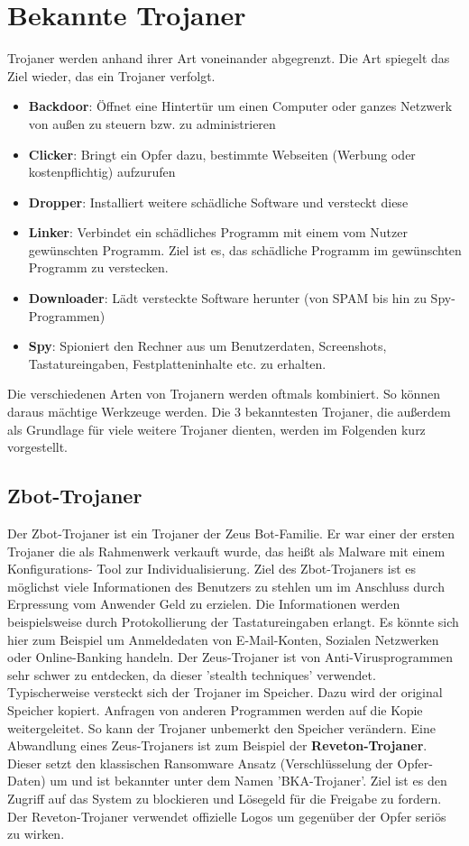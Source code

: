 \section{Bekannte Trojaner}\label{sec:bekannteTrojaner}
Trojaner werden anhand ihrer Art voneinander abgegrenzt. Die Art spiegelt das Ziel wieder, das ein Trojaner verfolgt. 
\begin{itemize}
    \item  \textbf{Backdoor}: Öffnet eine Hintertür um einen Computer oder ganzes Netzwerk von außen zu steuern bzw. zu administrieren
    \item \textbf{Clicker}: Bringt ein Opfer dazu, bestimmte Webseiten (Werbung oder kostenpflichtig) aufzurufen 
    \item \textbf{Dropper}: Installiert weitere schädliche Software und versteckt diese
    \item \textbf{Linker}: Verbindet ein schädliches Programm mit einem vom Nutzer gewünschten Programm. Ziel ist es, das schädliche Programm im gewünschten Programm zu verstecken.
    \item \textbf{Downloader}: Lädt versteckte Software herunter (von SPAM bis hin zu Spy-Programmen)
    \item \textbf{Spy}: Spioniert den Rechner aus um Benutzerdaten, Screenshots, Tastatureingaben, Festplatteninhalte etc. zu erhalten.
\end{itemize}
Die verschiedenen Arten von Trojanern werden oftmals kombiniert. So können daraus mächtige Werkzeuge werden. 
Die 3 bekanntesten Trojaner, die außerdem als Grundlage für viele weitere Trojaner dienten, werden im Folgenden kurz vorgestellt. 

\subsection{Zbot-Trojaner}
Der Zbot-Trojaner ist ein Trojaner der Zeus Bot-Familie. Er war einer der ersten
Trojaner die als Rahmenwerk verkauft wurde, das heißt als Malware mit einem Konfigurations-
Tool zur Individualisierung. Ziel des Zbot-Trojaners ist es möglichst viele Informationen
des Benutzers zu stehlen um im Anschluss durch Erpressung vom Anwender Geld zu 
erzielen. Die Informationen werden beispielsweise durch Protokollierung der Tastatureingaben erlangt. 
Es könnte sich hier zum Beispiel um Anmeldedaten von E-Mail-Konten, Sozialen Netzwerken oder Online-Banking
handeln.
Der Zeus-Trojaner ist von Anti-Virusprogrammen sehr schwer zu entdecken, da dieser 'stealth techniques' verwendet. 
Typischerweise versteckt sich der Trojaner im Speicher. Dazu wird der original Speicher kopiert. Anfragen von anderen Programmen werden auf die Kopie weitergeleitet.
So kann der Trojaner unbemerkt den Speicher verändern.
Eine Abwandlung eines Zeus-Trojaners ist zum Beispiel der \textbf{Reveton-Trojaner}.
Dieser setzt den klassischen Ransomware Ansatz (Verschlüsselung der Opfer-Daten) um und ist bekannter unter dem Namen 'BKA-Trojaner'.
Ziel ist es den Zugriff auf das System zu blockieren und Lösegeld für die Freigabe
zu fordern. Der Reveton-Trojaner verwendet offizielle Logos um gegenüber der Opfer 
seriös zu wirken.

